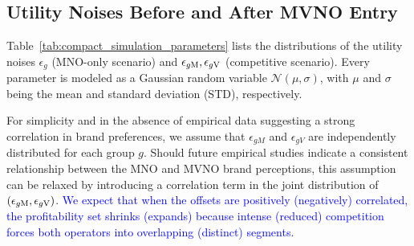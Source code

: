 \documentclass[12pt, draftclsnofoot, onecolumn]{IEEEtran}
\begin{document}
			\vspace{-.75cm}
		\subsection{Utility Noises Before and After MVNO Entry}
		Table~\ref{tab:compact_simulation_parameters} lists the distributions of the utility noises $\epsilon_g$ (MNO-only scenario) and $\epsilon_{g\rm M}, \epsilon_{g\rm V}$ (competitive scenario). Every parameter is modeled as a Gaussian random variable $\mathcal{N}(\mu, \sigma)$, with $\mu$ and $\sigma$ being the mean and standard deviation (STD), respectively. 
		
		For simplicity and in the absence of empirical data suggesting a strong correlation in brand preferences, we assume that $\epsilon_{gM}$ and $\epsilon_{gV}$ are independently distributed for each group $g$. Should future empirical studies  indicate a consistent relationship between the MNO and MVNO brand perceptions, this assumption can be relaxed by introducing a correlation term in the joint distribution of $(\epsilon_{g\rm M}, \epsilon_{g\rm V})$. \textcolor{blue}{We expect that when the offsets are positively (negatively) correlated, the profitability set shrinks (expands) because intense (reduced) competition forces both operators into overlapping (distinct) segments.
		}
		
		
		
			\vspace{-.5cm}
		
\end{document}
